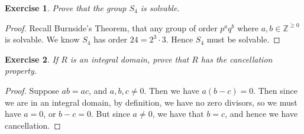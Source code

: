 \documentclass[10pt,oneside,reqno]{amsart}
\theoremstyle{plain}
\newtheorem{e}{Exercise}
\theoremstyle{definition}
\begin{document}
\begin{e}
Prove that the group $S_4$ is solvable. 
\end{e}
\begin{proof}
Recall Burnside's Theorem, that any group of order $p^aq^b$ where $a,b \in \mathbb{Z}^{\geq 0}$ is solvable. We know $S_4$ has order $24 = 2^3 \cdot 3$. Hence $S_4$ must be solvable. 
\end{proof}

\begin{e}
If $R$ is an integral domain, prove that $R$ has the cancellation property. 
\end{e}
\begin{proof}
Suppose $ab = ac$, and $a,b,c \neq 0$. Then we have $a(b - c) = 0$. Then since we are in an integral domain, by definition, we have no zero divisors, so we must have $a = 0$, or $b - c = 0$. But since $a \neq 0$, we have that $b = c$, and hence we have cancellation. 
\end{proof}
\end{document}
